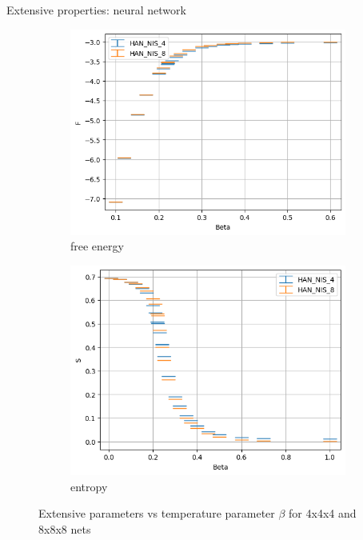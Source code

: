\documentclass{beamer}
\begin{document}
\begin{frame}{Extensive properties: neural network}
\begin{figure}
    \centering
    \begin{subfigure}{0.45\textwidth}
    \includegraphics[width=\textwidth]{plots/f.png}
    \caption{free energy}
    \end{subfigure} 
    \hfill
    \begin{subfigure}{0.45\textwidth}
    \includegraphics[width=\textwidth]{plots/s.png}
    \caption{entropy}
    \end{subfigure}
    \caption{Extensive parameters vs temperature parameter $\beta$ for 4x4x4 and 8x8x8 nets}
\end{figure}
\end{frame}
\end{document}
